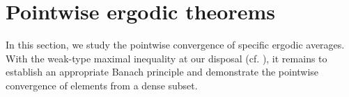 \documentclass[11pt]{amsart}
\theoremstyle{definition}
\theoremstyle{myremark}
\newtheorem{rem}[thm]{Remark}
\numberwithin{equation}{section}
\newcommand{\CM}{\mathcal{M}}
\newcommand{\eps}{\varepsilon}
\newcommand{\ups}{\upsilon}
\newcommand{\abs}[1]{\left\vert#1\right\vert}
\newcommand{\norm}[1]{\left\Vert#1\right\Vert}
\begin{document}
  
















 
	








		\section{\textbf{Pointwise ergodic theorems} }\label{Pointwise ergodic theorems}
		
		
		
		\noindent In this section, we study the pointwise convergence of specific ergodic averages. With the weak-type maximal inequality at our disposal 
		(cf.  \cite{cadilhac2022noncommutative}), 
		it remains to establish an appropriate Banach principle and demonstrate the pointwise convergence of elements from a dense subset. 
		
\end{document}
